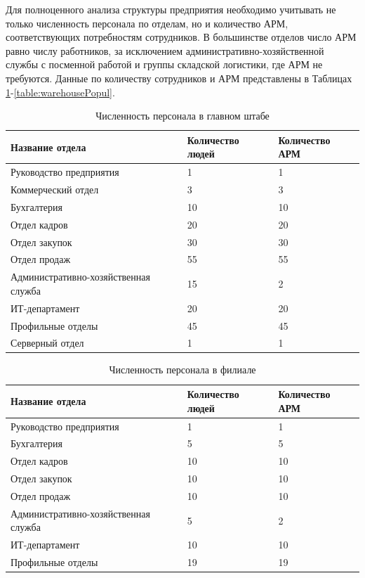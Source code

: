 \documentclass[14pt, a4paper]{extarticle}
\numberwithin{equation}{section}
\begin{document}
Для полноценного анализа структуры предприятия необходимо учитывать не 
только численность персонала по отделам, но и количество АРМ, 
соответствующих потребностям сотрудников. В большинстве отделов число 
АРМ равно числу работников, за исключением административно-хозяйственной 
службы с посменной работой и группы складской логистики, где АРМ не требуются. 
Данные по количеству сотрудников и АРМ представлены в Таблицах 
\ref{table:mainDepPopul}-\ref{table:warehousePopul}.

\begin{table}[H]
\centering
\small
\caption{Численность персонала в главном штабе}
\label{table:mainDepPopul}
\begin{tabular}{|m{5cm}|m{3cm}|m{3cm}|}
\hline
\textbf{Название отдела} & \textbf{Количество людей} & \textbf{Количество АРМ} \\
\hline
Руководство предприятия & 1 & 1 \\
\hline
Коммерческий отдел & 3 & 3 \\
\hline
Бухгалтерия & 10 & 10 \\
\hline
Отдел кадров & 20 & 20 \\
\hline
Отдел закупок & 30 & 30 \\
\hline
Отдел продаж & 55 & 55 \\
\hline
Административно-хозяйственная служба & 15 & 2 \\
\hline
ИТ-департамент & 20 & 20 \\
\hline
Профильные отделы & 45 & 45 \\
\hline
Серверный отдел & 1 & 1 \\
\hline
\end{tabular}
\end{table}


\begin{table}[H]
\centering
\small
\caption{Численность персонала в филиале}
\label{table:filialPopul}
\begin{tabular}{|m{5cm}|m{3cm}|m{3cm}|}
\hline
\textbf{Название отдела} & \textbf{Количество людей} & \textbf{Количество АРМ} \\
\hline
Руководство предприятия & 1 & 1 \\
\hline
Бухгалтерия & 5 & 5 \\
\hline
Отдел кадров & 10 & 10 \\
\hline
Отдел закупок & 10 & 10 \\
\hline
Отдел продаж & 10 & 10 \\
\hline
Административно-хозяйственная служба & 5 & 2 \\
\hline
ИТ-департамент & 10 & 10 \\
\hline
Профильные отделы & 19 & 19 \\
\hline
\end{tabular}
\end{table}
\end{document}
